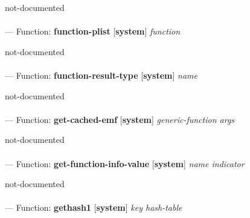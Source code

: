 \begin{adjustwidth}{5em}{5em}
not-documented
\end{adjustwidth}

\paragraph{}
\label{SYSTEM:FUNCTION-PLIST}
--- Function: \textbf{function-plist} [\textbf{system}] \textit{function}

\begin{adjustwidth}{5em}{5em}
not-documented
\end{adjustwidth}

\paragraph{}
\label{SYSTEM:FUNCTION-RESULT-TYPE}
--- Function: \textbf{function-result-type} [\textbf{system}] \textit{name}

\begin{adjustwidth}{5em}{5em}
not-documented
\end{adjustwidth}

\paragraph{}
\label{SYSTEM:GET-CACHED-EMF}
--- Function: \textbf{get-cached-emf} [\textbf{system}] \textit{generic-function args}

\begin{adjustwidth}{5em}{5em}
not-documented
\end{adjustwidth}

\paragraph{}
\label{SYSTEM:GET-FUNCTION-INFO-VALUE}
--- Function: \textbf{get-function-info-value} [\textbf{system}] \textit{name indicator}

\begin{adjustwidth}{5em}{5em}
not-documented
\end{adjustwidth}

\paragraph{}
\label{SYSTEM:GETHASH1}
--- Function: \textbf{gethash1} [\textbf{system}] \textit{key hash-table}

